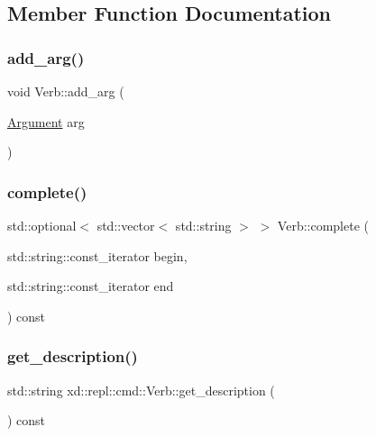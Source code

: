 \subsection{Member Function Documentation}
\mbox{\label{classxd_1_1repl_1_1cmd_1_1_verb_aaff144624594b846c6e7b287babfdc0e}} 
\subsubsection{\texorpdfstring{add\+\_\+arg()}{add\_arg()}}
{\footnotesize\ttfamily void Verb\+::add\+\_\+arg (\begin{DoxyParamCaption}\item[{\mbox{\hyperlink{classxd_1_1repl_1_1cmd_1_1_argument}{Argument}}}]{arg }\end{DoxyParamCaption})}

\mbox{\label{classxd_1_1repl_1_1cmd_1_1_verb_a3ea85ceb0c367ab47b1781372cbf3817}} 
\subsubsection{\texorpdfstring{complete()}{complete()}}
{\footnotesize\ttfamily std\+::optional$<$ std\+::vector$<$ std\+::string $>$ $>$ Verb\+::complete (\begin{DoxyParamCaption}\item[{std\+::string\+::const\+\_\+iterator}]{begin,  }\item[{std\+::string\+::const\+\_\+iterator}]{end }\end{DoxyParamCaption}) const}

\mbox{\label{classxd_1_1repl_1_1cmd_1_1_verb_a0e66bbd2015f8becba3262b2388e2681}} 
\subsubsection{\texorpdfstring{get\+\_\+description()}{get\_description()}}
{\footnotesize\ttfamily std\+::string xd\+::repl\+::cmd\+::\+Verb\+::get\+\_\+description (\begin{DoxyParamCaption}{ }\end{DoxyParamCaption}) const\hspace{0.3cm}{\ttfamily [inline]}}

